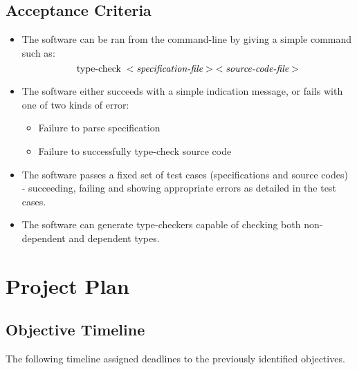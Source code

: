 \documentclass{ProgressReport}[2020/09/15]
\begin{document}
          \section{Acceptance Criteria}

          \begin{itemize}
          \item The software can be ran from the command-line by
            giving a simple command such as: $$\mbox{type-check} \;
            <\emph{specification-file}> \;
            <\emph{source-code-file}>$$
          \item The software either succeeds with a simple indication
            message, or fails with one of two kinds of error:
            \begin{itemize}
            \item Failure to parse specification
            \item Failure to successfully type-check source code
            \end{itemize}
          \item The software passes a fixed set of test cases (specifications and
            source codes) - succeeding, failing and showing
            appropriate errors as detailed in the test cases.
          \item The software can generate type-checkers capable of
            checking both non-dependent and dependent types.
          \end{itemize}
        
        \chapter{Project Plan}

        \section{Objective Timeline}

        The following timeline assigned deadlines to the previously
        identified objectives.
        
\end{document}
